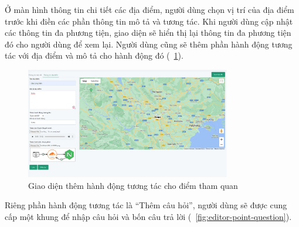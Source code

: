 \newpage
Ở màn hình thông tin chi tiết các địa điểm, người dùng chọn vị trí của địa điểm
trước khi điền các phần thông tin mô tả và tương tác. Khi người dùng cập nhật các
thông tin đa phương tiện, giao diện sẽ hiển thị lại thông tin đa phương tiện đó cho
người dùng để xem lại. Người dùng cũng sẽ thêm phần hành động tương tác với địa
điểm và mô tả cho hành động đó (\figurename~\ref{fig:editor-point-action}).

\begin{figure}[h]
    \centering
    \includegraphics[width=0.8\textwidth]{figures/editor-point-action.jpg}
    \caption{Giao diện thêm hành động tương tác cho điểm tham quan}
    \label{fig:editor-point-action}
\end{figure}
Riêng phần hành động tương tác là “Thêm câu hỏi”, người dùng sẽ được cung
cấp một khung để nhập câu hỏi và bốn câu trả lời (\figurename~\ref{fig:editor-point-question}).

